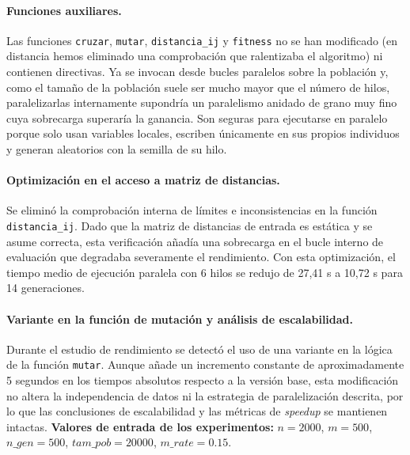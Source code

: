 \documentclass[12pt]{article}
\begin{document}
\begin{enumerate}
\paragraph{Funciones auxiliares.}
Las funciones \texttt{cruzar}, \texttt{mutar}, \texttt{distancia\_ij} y \texttt{fitness} no se han modificado (en distancia hemos eliminado una comprobación que ralentizaba el algoritmo) ni contienen directivas. Ya se invocan desde bucles paralelos sobre la población y, como el tamaño de la población suele ser mucho mayor que el número de hilos, paralelizarlas internamente supondría un paralelismo anidado de grano muy fino cuya sobrecarga superaría la ganancia. Son seguras para ejecutarse en paralelo porque solo usan variables locales, escriben únicamente en sus propios individuos y generan aleatorios con la semilla de su hilo.



\paragraph{Optimización en el acceso a matriz de distancias.}
Se eliminó la comprobación interna de límites e inconsistencias en la función \texttt{distancia\_ij}. Dado que la matriz de distancias de entrada es estática y se asume correcta, esta verificación añadía una sobrecarga en el bucle interno de evaluación que degradaba severamente el rendimiento. Con esta optimización, el tiempo medio de ejecución paralela con 6 hilos se redujo de 27,41 s a 10,72 s para 14 generaciones.

\paragraph{Variante en la función de mutación y análisis de escalabilidad.}
Durante el estudio de rendimiento se detectó el uso de una variante en la lógica de la función \texttt{mutar}. Aunque añade un incremento constante de aproximadamente 5 segundos en los tiempos absolutos respecto a la versión base, esta modificación no altera la independencia de datos ni la estrategia de paralelización descrita, por lo que las conclusiones de escalabilidad y las métricas de \textit{speedup} se mantienen intactas.
\textbf{Valores de entrada de los experimentos:} $n = 2000$, $m = 500$, $n\_gen = 500$, $tam\_pob = 20000$, $m\_rate = 0.15$.



\end{enumerate}
\end{document}
